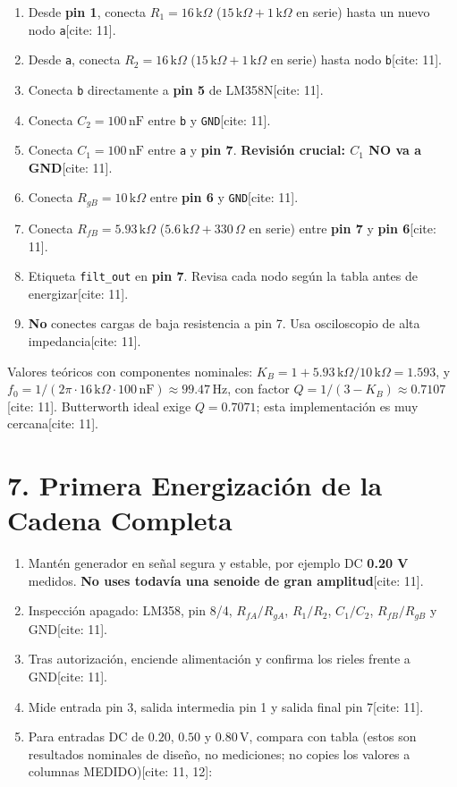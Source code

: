 \documentclass[11pt, a4paper]{article}
\begin{document}
\begin{enumerate}[noitemsep, leftmargin=*]
    \item Desde \textbf{pin 1}, conecta $R_1 = 16\,\text{k}\Omega$ ($15\,\text{k}\Omega+1\,\text{k}\Omega$ en serie) hasta un nuevo nodo \texttt{a}[cite: 11].
    \item Desde \texttt{a}, conecta $R_2 = 16\,\text{k}\Omega$ ($15\,\text{k}\Omega+1\,\text{k}\Omega$ en serie) hasta nodo \texttt{b}[cite: 11].
    \item Conecta \texttt{b} directamente a \textbf{pin 5} de LM358N[cite: 11].
    \item Conecta $C_2 = 100\,\text{nF}$ entre \texttt{b} y \texttt{GND}[cite: 11].
    \item Conecta $C_1 = 100\,\text{nF}$ entre \texttt{a} y \textbf{pin 7}. \textbf{Revisión crucial: $C_1$ NO va a GND}[cite: 11].
    \item Conecta $R_{gB} = 10\,\text{k}\Omega$ entre \textbf{pin 6} y \texttt{GND}[cite: 11].
    \item Conecta $R_{fB} = 5.93\,\text{k}\Omega$ ($5.6\,\text{k}\Omega+330\,\Omega$ en serie) entre \textbf{pin 7} y \textbf{pin 6}[cite: 11].
    \item Etiqueta \texttt{filt\_out} en \textbf{pin 7}. Revisa cada nodo según la tabla antes de energizar[cite: 11].
    \item \textbf{No} conectes cargas de baja resistencia a pin 7. Usa osciloscopio de alta impedancia[cite: 11].
\end{enumerate}

Valores teóricos con componentes nominales: $K_B = 1 + 5.93\,\text{k}\Omega/10\,\text{k}\Omega = 1.593$, y $f_0 = 1/(2\pi \cdot 16\,\text{k}\Omega \cdot 100\,\text{nF}) \approx 99.47\,\text{Hz}$, con factor $Q = 1/(3-K_B) \approx 0.7107$[cite: 11]. Butterworth ideal exige $Q = 0.7071$; esta implementación es muy cercana[cite: 11].

\section{7. Primera Energización de la Cadena Completa}
\begin{enumerate}[noitemsep, leftmargin=*]
    \item Mantén generador en señal segura y estable, por ejemplo DC \textbf{0.20 V} medidos. \textbf{No uses todavía una senoide de gran amplitud}[cite: 11].
    \item Inspección apagado: LM358, pin 8/4, $R_{fA}/R_{gA}$, $R_1/R_2$, $C_1/C_2$, $R_{fB}/R_{gB}$ y GND[cite: 11].
    \item Tras autorización, enciende alimentación y confirma los rieles frente a GND[cite: 11].
    \item Mide entrada pin 3, salida intermedia pin 1 y salida final pin 7[cite: 11].
    \item Para entradas DC de $0.20$, $0.50$ y $0.80\,\text{V}$, compara con tabla (estos son resultados nominales de diseño, no mediciones; no copies los valores a columnas MEDIDO)[cite: 11, 12]:
\end{enumerate}
\end{document}
